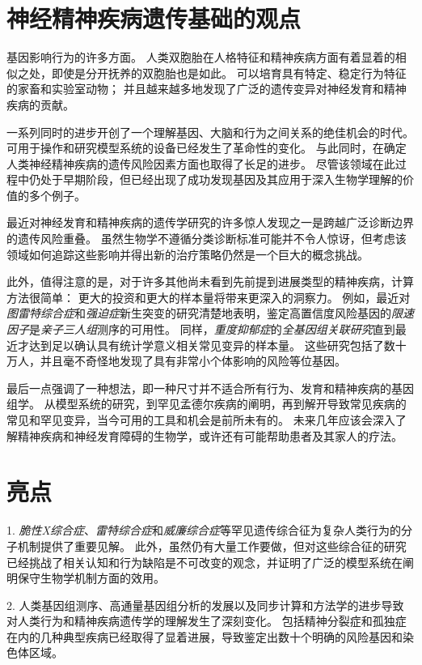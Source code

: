 \section{神经精神疾病遗传基础的观点}

基因影响行为的许多方面。
人类双胞胎在人格特征和精神疾病方面有着显着的相似之处，即使是分开抚养的双胞胎也是如此。 
可以培育具有特定、稳定行为特征的家畜和实验室动物；
并且越来越多地发现了广泛的遗传变异对神经发育和精神疾病的贡献。


一系列同时的进步开创了一个理解基因、大脑和行为之间关系的绝佳机会的时代。
可用于操作和研究模型系统的设备已经发生了革命性的变化。
与此同时，在确定人类神经精神疾病的遗传风险因素方面也取得了长足的进步。
尽管该领域在此过程中仍处于早期阶段，但已经出现了成功发现基因及其应用于深入生物学理解的价值的多个例子。


最近对神经发育和精神疾病的遗传学研究的许多惊人发现之一是跨越广泛诊断边界的遗传风险重叠。 
虽然生物学不遵循分类诊断标准可能并不令人惊讶，但考虑该领域如何追踪这些影响并得出新的治疗策略仍然是一个巨大的概念挑战。


此外，值得注意的是，对于许多其他尚未看到先前提到进展类型的精神疾病，计算方法很简单：
更大的投资和更大的样本量将带来更深入的洞察力。 
例如，最近对\textit{图雷特综合症}和\textit{强迫症}新生突变的研究清楚地表明，鉴定高置信度风险基因的\textit{限速因子}是\textit{亲子三人组}测序的可用性。
同样，\textit{重度抑郁症}的\textit{全基因组关联研究}直到最近才达到足以确认具有统计学意义相关常见变异的样本量。 
这些研究包括了数十万人，并且毫不奇怪地发现了具有非常小个体影响的风险等位基因。


最后一点强调了一种想法，即一种尺寸并不适合所有行为、发育和精神疾病的基因组学。 
从模型系统的研究，到罕见孟德尔疾病的阐明，再到解开导致常见疾病的常见和罕见变异，当今可用的工具和机会是前所未有的。 
未来几年应该会深入了解精神疾病和神经发育障碍的生物学，或许还有可能帮助患者及其家人的疗法。


\section{亮点}

1. \textit{脆性X综合症}、\textit{雷特综合症}和\textit{威廉综合症}等罕见遗传综合征为复杂人类行为的分子机制提供了重要见解。 
此外，虽然仍有大量工作要做，但对这些综合征的研究已经挑战了相关认知和行为缺陷是不可改变的观念，并证明了广泛的模型系统在阐明保守生物学机制方面的效用。


2. 人类基因组测序、高通量基因组分析的发展以及同步计算和方法学的进步导致对人类行为和精神疾病遗传学的理解发生了深刻变化。
包括精神分裂症和孤独症在内的几种典型疾病已经取得了显着进展，导致鉴定出数十个明确的风险基因和染色体区域。


